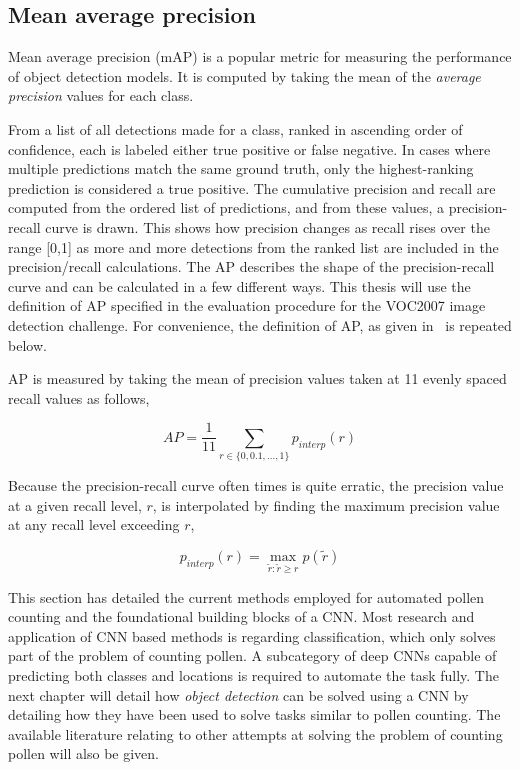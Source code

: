 \subsection{Mean average precision}
Mean average precision (mAP) is a popular metric for measuring the performance of object detection models.
It is computed by taking the mean of the \textit{average precision} values for each class.

From a list of all detections made for a class, ranked in ascending order of confidence, each is labeled either true positive or false negative.
In cases where multiple predictions match the same ground truth, only the highest-ranking prediction is considered a true positive.
The cumulative precision and recall are computed from the ordered list of predictions, and from these values, a precision-recall curve is drawn.
This shows how precision changes as recall rises over the range [0,1] as more and more detections from the ranked list are included in the precision/recall calculations.
The AP describes the shape of the precision-recall curve and can be calculated in a few different ways.
This thesis will use the definition of AP specified in the evaluation procedure for the VOC2007 image detection challenge.
For convenience, the definition of AP, as given in\ \textcite{everingham2010pascal} is repeated below.

AP is measured by taking the mean of precision values taken at 11 evenly spaced recall values as follows,

\begin{equation}\label{eq:average-precision}
  AP=\frac{1}{11} \sum_{r\in \{0,0.1,\dots,1\}}p_{interp}(r)
\end{equation}

Because the precision-recall curve often times is quite erratic, the precision value at a given recall level, \(r\), is interpolated by finding the maximum precision value at any recall level exceeding \(r\),

\begin{equation*}
  p_{interp}(r)=\max_{\tilde{r}:\tilde{r}\geq r}p(\tilde{r})
\end{equation*}

This section has detailed the current methods employed for automated pollen counting and the foundational building blocks of a CNN\@.
Most research and application of CNN based methods is regarding classification, which only solves part of the problem of counting pollen.
A subcategory of deep CNNs capable of predicting both classes and locations is required to automate the task fully.
The next chapter will detail how \textit{object detection} can be solved using a CNN by detailing how they have been used to solve tasks similar to pollen counting.
The available literature relating to other attempts at solving the problem of counting pollen will also be given.
